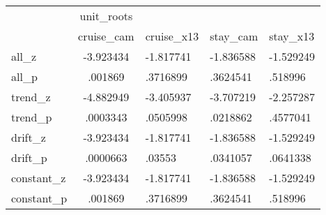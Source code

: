 \begin{tabular}{l*{1}{c}} \hline\hline
            &  unit\_roots&            &            &            \\
            &  cruise\_cam&  cruise\_x13&    stay\_cam&    stay\_x13\\
\hline
all\_z       &   -3.923434&   -1.817741&   -1.836588&   -1.529249\\
all\_p       &     .001869&    .3716899&    .3624541&     .518996\\
trend\_z     &   -4.882949&   -3.405937&   -3.707219&   -2.257287\\
trend\_p     &    .0003343&    .0505998&    .0218862&    .4577041\\
drift\_z     &   -3.923434&   -1.817741&   -1.836588&   -1.529249\\
drift\_p     &    .0000663&      .03553&    .0341057&    .0641338\\
constant\_z  &   -3.923434&   -1.817741&   -1.836588&   -1.529249\\
constant\_p  &     .001869&    .3716899&    .3624541&     .518996\\
\hline\hline
\end{tabular}

